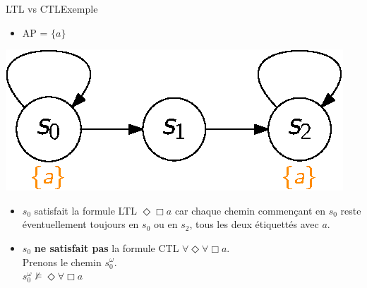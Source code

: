 \documentclass[compress]{beamer}
\begin{document}
\begin{frame}{LTL vs CTL}{Exemple}
\vspace{-0.05\linewidth}
\begin{itemize}
  \item AP = {\color{DarkOrange}$\{a\}$}
\end{itemize}
\begin{center}
  \includegraphics[width=0.4\linewidth]{resources/ctl_vs_ltl}
\end{center}
\vspace{-0.05\linewidth}
\begin{itemize}
  \item $s_0$ satisfait la formule LTL $\Diamond \Box a$ car
  chaque chemin commençant en $s_0$ reste éventuellement toujours en $s_0$ ou en
  $s_2$, tous les deux étiquettés avec $a$.
  \item $s_0$ \alert{\textbf{ne satisfait pas}} la formule CTL $\forall \Diamond \forall
  \Box a$.\\
  Prenons le chemin $s_0^\omega$. \\$s_0^\omega \not\models \Diamond \forall \Box a$
\end{itemize}
\end{frame}
\end{document}
